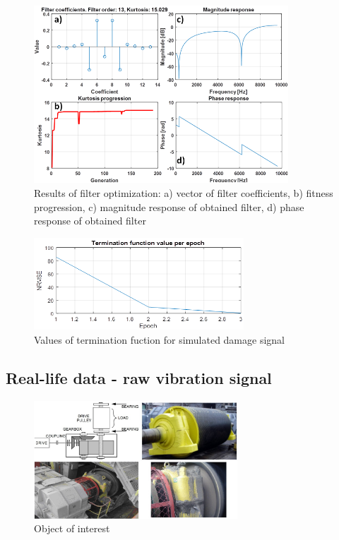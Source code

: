 \documentclass[preprint,12pt]{elsarticle}
\begin{document}
\begin{figure}[ht!]
\centering
\includegraphics[width=0.85\textwidth]{wykresy/simd3.png}
\caption{Results of filter optimization: a) vector of filter coefficients, b) fitness progression, c) magnitude response of obtained filter, d) phase response of obtained filter}
\label{fig:simd3}
\end{figure}

\begin{figure}[ht!]
\centering
\includegraphics[width=0.7\textwidth]{wykresy/simd4.png}
\caption{Values of termination fuction for simulated damage signal}
\label{fig:simd4}
\end{figure}

\subsection{Real-life data - raw vibration signal}

\begin{figure}[ht!]
\centering
\includegraphics[width=0.68\textwidth]{wykresy/gb.PNG}
\caption{Object of interest}
\label{fig:gb}
\end{figure}
\end{document}
